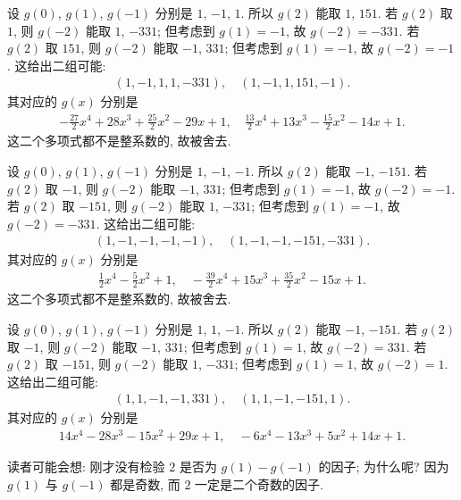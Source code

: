 \begin{example}
    设 $g(0)$, $g(1)$, $g(-1)$ 分别是 $1$, $-1$, $1$. 所以 $g(2)$ 能取 $1$, $151$. 若 $g(2)$ 取 $1$, 则 $g(-2)$ 能取 $1$, $-331$; 但考虑到 $g(1) = -1$, 故 $g(-2) = -331$. 若 $g(2)$ 取 $151$, 则 $g(-2)$ 能取 $-1$, $331$; 但考虑到 $g(1) = -1$, 故 $g(-2) = -1$. 这给出二组可能:
    \begin{align*}
        (1,-1,1,1,-331), \quad (1,-1,1,151,-1).
    \end{align*}
    其对应的 $g(x)$ 分别是
    \begin{align*}
        -\frac{27}{2} x^4+28 x^3+\frac{25}{2} x^2-29 x+1, \quad \frac{13}{2} x^4+13 x^3-\frac{15}{2} x^2-14 x+1.
    \end{align*}
    这二个多项式都不是整系数的, 故被舍去.

    设 $g(0)$, $g(1)$, $g(-1)$ 分别是 $1$, $-1$, $-1$. 所以 $g(2)$ 能取 $-1$, $-151$. 若 $g(2)$ 取 $-1$, 则 $g(-2)$ 能取 $-1$, $331$; 但考虑到 $g(1) = -1$, 故 $g(-2) = -1$. 若 $g(2)$ 取 $-151$, 则 $g(-2)$ 能取 $1$, $-331$; 但考虑到 $g(1) = -1$, 故 $g(-2) = -331$. 这给出二组可能:
    \begin{align*}
        (1,-1,-1,-1,-1), \quad (1,-1,-1,-151,-331).
    \end{align*}
    其对应的 $g(x)$ 分别是
    \begin{align*}
        \frac{1}{2} x^4-\frac{5}{2} x^2+1, \quad -\frac{39}{2} x^4+15 x^3+\frac{35}{2} x^2-15 x+1.
    \end{align*}
    这二个多项式都不是整系数的, 故被舍去.

    设 $g(0)$, $g(1)$, $g(-1)$ 分别是 $1$, $1$, $-1$. 所以 $g(2)$ 能取 $-1$, $-151$. 若 $g(2)$ 取 $-1$, 则 $g(-2)$ 能取 $-1$, $331$; 但考虑到 $g(1) = 1$, 故 $g(-2) = 331$. 若 $g(2)$ 取 $-151$, 则 $g(-2)$ 能取 $1$, $-331$; 但考虑到 $g(1) = 1$, 故 $g(-2) = 1$. 这给出二组可能:
    \begin{align*}
        (1,1,-1,-1,331), \quad (1,1,-1,-151,1).
    \end{align*}
    其对应的 $g(x)$ 分别是
    \begin{align*}
        14 x^4-28 x^3-15 x^2+29 x+1, \quad -6 x^4-13 x^3+5 x^2+14 x+1.
    \end{align*}

    读者可能会想: 刚才没有检验 $2$ 是否为 $g(1) - g(-1)$ 的因子; 为什么呢? 因为 $g(1)$ 与 $g(-1)$ 都是奇数, 而 $2$ 一定是二个奇数的因子.


\end{example}
